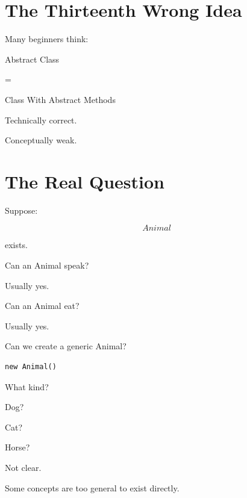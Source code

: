 \documentclass[11pt,a4paper]{book}
\begin{document}
\section{The Thirteenth Wrong Idea}

\begin{trap}

Many beginners think:

Abstract Class

=

Class With Abstract Methods

Technically correct.

Conceptually weak.

\end{trap}


\section{The Real Question}

Suppose:

\[
Animal
\]

exists.


Can an Animal speak?

Usually yes.


Can an Animal eat?

Usually yes.


Can we create a generic Animal?

\begin{verbatim}
new Animal()
\end{verbatim}


What kind?

Dog?

Cat?

Horse?


Not clear.


\begin{idea}

Some concepts are too general to exist directly.

\end{idea}
\end{document}
